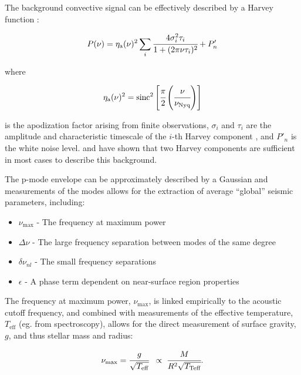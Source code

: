 The background convective signal can be effectively described by a Harvey function \citep{harvey_high-resolution_1985}:

\begin{equation}
    P(\nu) = \eta_\mathrm{a}(\nu)^2 \sum_{i} \cfrac{4\sigma_i^2\tau_i}{1+(2\pi\nu\tau_i)^2} + P'_n
    \label{eqtn:Harvey}
\end{equation}

where 

\begin{equation}
    \eta_\mathrm{a}(\nu)^2 = \operatorname{sinc}^2{\left[\cfrac{\pi}{2}\left(\cfrac{\nu}{\nu_{\mathrm{Nyq}}}\right)\right]}
    \label{eqtn:apod}
\end{equation}

\noindent is the apodization factor arising from finite observations, $\sigma_i$ and $\tau_i$ are the amplitude and characteristic timescale of the $i$-th Harvey component \citep{mathur_granulation_2011}, and $P'_n$ is the white noise level. \cite{karoff_observations_2013} and \cite{kallinger_connection_2014} have shown that two Harvey components are sufficient in most cases to describe this background.

The p-mode envelope can be approximately described by a Gaussian \citep{kallinger_evolutionary_2012} and measurements of the modes allows for the extraction of average ``global'' seismic parameters, including:

\begin{itemize}
    \item $\nu_{\mathrm{max}}$ - The frequency at maximum power \citep{kjeldsen_amplitudes_1995, brown_detection_1991}
    \item $\Delta\nu$ - The large frequency separation between modes of the same degree
    \item $\delta\nu_{nl}$ - The small frequency separations
    \item $\epsilon$ - A phase term dependent on near-surface region properties
\end{itemize}

The frequency at maximum power, $\nu_{\mathrm{max}}$, is linked empirically to the acoustic cutoff frequency, and combined with measurements of the effective temperature, $T_{\mathrm{eff}}$ (eg. from spectroscopy), allows for the direct measurement of surface gravity, $g$, and thus stellar mass and radius:

\begin{equation}
    \nu_{\mathrm{max}} = \cfrac{g}{\sqrt{T_{\mathrm{eff}}}} \;\; \propto \; \cfrac{M}{R^2 \sqrt{T_{\mathrm{Teff}}}}.
\end{equation}

